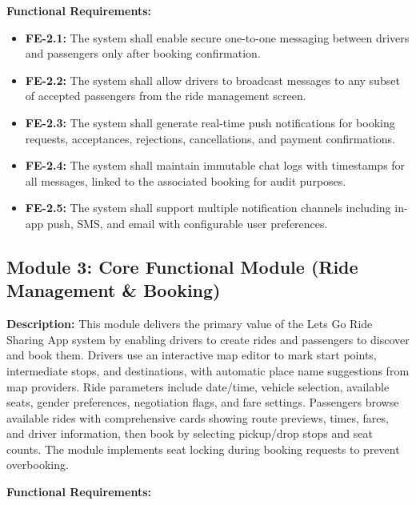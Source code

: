 \textbf{Functional Requirements:}

\begin{itemize}
    \item \textbf{FE-2.1:} The system shall enable secure one-to-one messaging between drivers and passengers only after booking confirmation.
    
    \item \textbf{FE-2.2:} The system shall allow drivers to broadcast messages to any subset of accepted passengers from the ride management screen.
    
    \item \textbf{FE-2.3:} The system shall generate real-time push notifications for booking requests, acceptances, rejections, cancellations, and payment confirmations.
    
    \item \textbf{FE-2.4:} The system shall maintain immutable chat logs with timestamps for all messages, linked to the associated booking for audit purposes.
    
    \item \textbf{FE-2.5:} The system shall support multiple notification channels including in-app push, SMS, and email with configurable user preferences.
\end{itemize}

\subsection{Module 3: Core Functional Module (Ride Management \& Booking)}

\textbf{Description:} This module delivers the primary value of the Lets Go Ride Sharing App system by enabling drivers to create rides and passengers to discover and book them. Drivers use an interactive map editor to mark start points, intermediate stops, and destinations, with automatic place name suggestions from map providers. Ride parameters include date/time, vehicle selection, available seats, gender preferences, negotiation flags, and fare settings. Passengers browse available rides with comprehensive cards showing route previews, times, fares, and driver information, then book by selecting pickup/drop stops and seat counts. The module implements seat locking during booking requests to prevent overbooking.

\textbf{Functional Requirements:}

